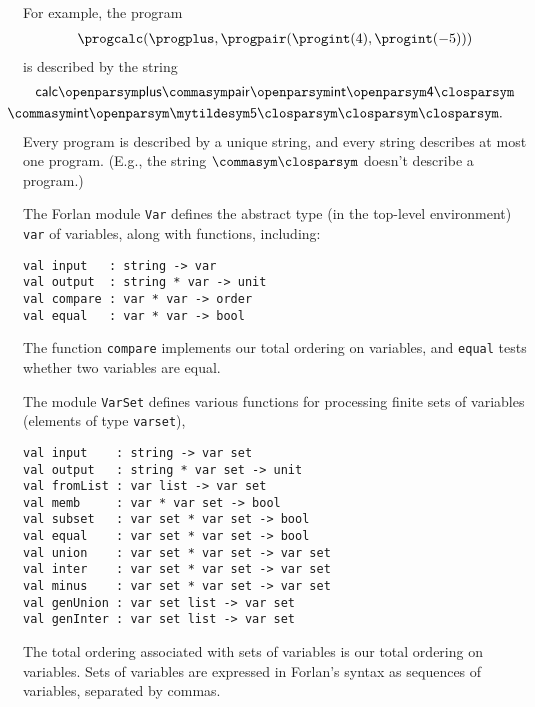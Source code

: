 For example, the program
\begin{gather*}
\progcalc(\progplus,\progpair(\progint(4),\progint(-5)))
\end{gather*}
is described by the string
\begin{gather*}
\mathsf{calc\openparsym plus\commasym pair\openparsym int
\openparsym 4\closparsym} \\
\hspace{-1cm}
\mathsf{\commasym int\openparsym\mytildesym 5\closparsym\closparsym\closparsym} .
\end{gather*}
Every program is described by a unique string, and every
string describes at most one program.  (E.g., the string
$\mathsf{\commasym\closparsym}$ doesn't describe a program.)

The Forlan module \texttt{Var} defines the abstract type (in the top-level
environment) \texttt{var} of variables, along with functions, including:
\begin{verbatim}
val input   : string -> var
val output  : string * var -> unit
val compare : var * var -> order
val equal   : var * var -> bool
\end{verbatim}
The function \texttt{compare} implements our total ordering on
variables, and \texttt{equal} tests whether two
variables are equal.

The module \texttt{VarSet}
%
defines various functions for processing
finite sets of variables (elements of type \texttt{var\;set}),
%
\begin{verbatim}
val input    : string -> var set
val output   : string * var set -> unit
val fromList : var list -> var set
val memb     : var * var set -> bool
val subset   : var set * var set -> bool
val equal    : var set * var set -> bool
val union    : var set * var set -> var set
val inter    : var set * var set -> var set
val minus    : var set * var set -> var set
val genUnion : var set list -> var set
val genInter : var set list -> var set
\end{verbatim}
%
%
%
%
%
%
%
%
%
%
%
The total ordering associated with sets of variables is our total
ordering on variables.  Sets of variables are expressed in Forlan's syntax
as sequences of variables, separated by commas.

